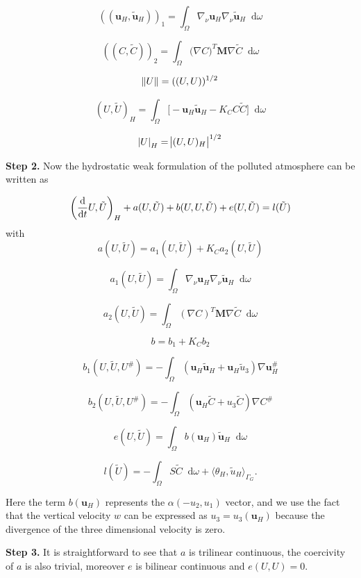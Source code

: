 \documentclass[11pt]{article}
\newcommand*\diff{\mathop{}\!\mathrm{d}}
\begin{document}
\[ ((\mathbf{u}_H, \mathbf{\tilde{u}}_H))_1 = \int_\Omega \nabla_\nu \mathbf{u}_H \nabla_\nu \mathbf{\tilde{u}}_H \diff \omega \]

\[ ((C, \tilde{C}))_2 = \int _\Omega \big (\nabla C)^T \mathbf{M} \nabla \tilde{C} \diff \omega \]

\[\norm{U} = ((U,U)) ^ {1/2}\]

\[ (U, \tilde{U})_H = \int _\Omega \big [ -\mathbf{u}_H \mathbf{\tilde{u}}_H - K_C C \tilde{C} \big ] \diff \omega \]

\[\abs{U}_H = \abs{(U,U)_H}^{1/2}\]

\textbf{Step 2.} Now the hydrostatic weak formulation of the polluted atmosphere can be written as

\begin{equation} \label{EXISTENCEFORMAT}
\bigg ( \frac{\diff}{\diff t} U, \tilde{U} \bigg ) _H + a(U, \tilde{U}) + b(U,U,\tilde{U}) + e(U, \tilde{U}) = l(\tilde{U}) \\
\end{equation}
%
with
%
\[ a(U,\tilde{U}) = a_1 (U, \tilde{U}) + K_C a_2 (U, \tilde{U})\]

\[ a_1 (U, \tilde{U}) = \int_\Omega \nabla_\nu \mathbf{u}_H \nabla_\nu \mathbf{\tilde{u}}_H \diff \omega \]

\[ a_2 (U, \tilde{U}) = \int_\Omega (\nabla C)^T \mathbf{M} \nabla \tilde{C} \diff \omega \]

\[ b = b_1 + K_C b_2\]

\[ b_1 (U, \tilde{U}, U^\#) = - \int_\Omega (\mathbf{u}_H \mathbf{\tilde{u}}_H + \mathbf{u}_H \tilde{u}_3) \nabla \mathbf{u}_H^\# \]

\[ b_2 (U, \tilde{U}, U^\#) = - \int_\Omega (\mathbf{u}_H \tilde{C} + u_3 \tilde{C}) \nabla C^\# \]

\[ e(U, \tilde{U}) = \int_\Omega b(\mathbf{u}_H) \mathbf{\tilde{u}}_H \diff \omega \]

\[ l(\tilde{U}) = - \int_\Omega S \tilde{C} \diff \omega + \langle \theta_H, \tilde{u}_H \rangle _{\Gamma_G}. \]

Here the term $b(\mathbf{u}_H)$ represents the $\alpha (-u_2, u_1)$ vector, and we use the fact that the vertical velocity $w$ can be expressed as $u_3 = u_3(\mathbf{u}_H)$ because the divergence of the three dimensional velocity is zero.

\textbf{Step 3.} It is straightforward to see that $a$ is trilinear continuous, the coercivity of $a$ is also trivial, moreover $e$ is bilinear continuous and $e(U,U) = 0$.
\end{document}
